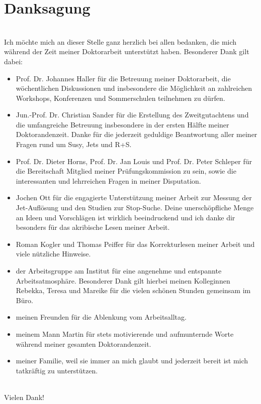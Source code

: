 \section*{Danksagung}
\ \\
Ich m\"ochte mich an dieser Stelle ganz herzlich bei allen bedanken, die mich w\"ahrend der Zeit meiner Doktorarbeit unterst\"utzt haben. Besonderer Dank gilt dabei:
\begin{itemize}
\item Prof. Dr. Johannes Haller f\"ur die Betreuung meiner Doktorarbeit, die w\"ochentlichen Diskussionen und insbesondere die M\"oglichkeit an zahlreichen Workshops, Konferenzen und Sommerschulen teilnehmen zu d\"urfen.    
\item Jun.-Prof. Dr. Christian Sander f\"ur die Erstellung des Zweitgutachtens und die umfangreiche Betreuung insbesondere in der ersten H\"alfte meiner Doktorandenzeit. Danke f\"ur die jederzeit geduldige Beantwortung aller meiner Fragen rund um Susy, Jets und R+S.
\item Prof. Dr. Dieter Horns, Prof. Dr. Jan Louis und Prof. Dr. Peter Schleper f\"ur die Bereitschaft Mitglied meiner Pr\"ufungskommission zu sein, sowie die interessanten und lehrreichen Fragen in meiner Disputation.
\item Jochen Ott f\"ur die engagierte Unterst\"utzung meiner Arbeit zur Messung der Jet-Aufl\"osung und den Studien zur Stop-Suche. Deine unersch\"opfliche Menge an Ideen und Vorschl\"agen ist wirklich beeindruckend und ich danke dir besonders f\"ur das akribische Lesen meiner Arbeit.
\item Roman Kogler und Thomas Peiffer f\"ur das Korrekturlesen meiner Arbeit und viele n\"utzliche Hinweise.
\item der Arbeitsgruppe am Institut f\"ur eine angenehme und entspannte Arbeitsatmosph\"are. Besonderer Dank gilt hierbei meinen Kolleginnen Rebekka, Teresa und Mareike f\"ur die vielen sch\"onen Stunden gemeinsam im B\"uro.
\item meinen Freunden f\"ur die Ablenkung vom Arbeitsalltag.
\item meinem Mann Martin f\"ur stets motivierende und aufmunternde Worte w\"ahrend meiner gesamten Doktorandenzeit.
\item meiner Familie, weil sie immer an mich glaubt und jederzeit bereit ist mich tatkr\"aftig zu unterst\"utzen.
\end{itemize}
\ \\
Vielen Dank!
